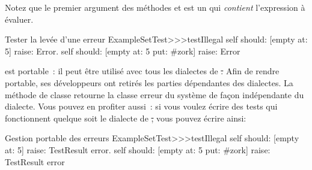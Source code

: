 \documentclass[a4paper,10pt,twoside]{book}
\begin{document}

Notez que le premier argument des méthodes  et  est un  qui \emph{contient}
l'expression à évaluer.

\begin{method}[ESTtestIllegal]{Tester la levée d'une erreur}
ExampleSetTest>>>testIllegal
	self should: [empty at: 5] raise: Error.
	self should: [empty at: 5 put: #zork] raise: Error
\end{method}

\sunit est portable~: il peut être utilisé avec tous les dialectes de \st. Afin de rendre \sunit portable, ses développeurs ont retirés les parties dépendantes des dialectes. La méthode de classe  retourne la classe erreur du système de façon indépendante du dialecte. Vous pouvez en profiter aussi~: si vous voulez écrire des tests qui fonctionnent quelque soit le dialecte de \st, vous pouvez écrire  ainsi:

\begin{method}[portabletestillegal]{Gestion portable des erreurs}
ExampleSetTest>>>testIllegal
	self should: [empty at: 5] raise: TestResult error.
	self should: [empty at: 5 put: #zork] raise: TestResult error
\end{method}


\end{document}
